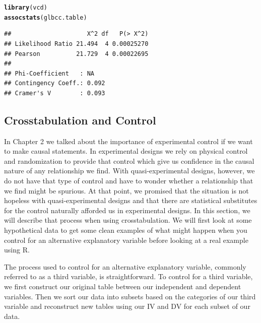 \documentclass[11pt,openany]{book}\usepackage[]{graphicx}\usepackage[]{color}
\makeatletter
\newcommand{\hlstd}[1]{\textcolor[rgb]{0.345,0.345,0.345}{#1}}%
\newcommand{\hlkwd}[1]{\textcolor[rgb]{0.737,0.353,0.396}{\textbf{#1}}}%
\newenvironment{kframe}{%
 \def\at@end@of@kframe{}%
 \ifinner\ifhmode%
  \def\at@end@of@kframe{\end{minipage}}%
  \begin{minipage}{\columnwidth}%
 \fi\fi%
 \def\FrameCommand##1{\hskip\@totalleftmargin \hskip-\fboxsep
 \colorbox{shadecolor}{##1}\hskip-\fboxsep
     \hskip-\linewidth \hskip-\@totalleftmargin \hskip\columnwidth}%
 \MakeFramed {\advance\hsize-\width
   \@totalleftmargin\z@ \linewidth\hsize
   \@setminipage}}%
 {\par\unskip\endMakeFramed%
 \at@end@of@kframe}
\newenvironment{knitrout}{}{} %
\renewenvironment{knitrout}{\begin{singlespace}}{\end{singlespace}} %
\makeatother
\begin{document}
\begin{knitrout}
\color{fgcolor}\begin{kframe}
\begin{alltt}
\hlkwd{library}\hlstd{(vcd)}
\hlkwd{assocstats}\hlstd{(glbcc.table)}
\end{alltt}
\begin{verbatim}
##                     X^2 df   P(> X^2)
## Likelihood Ratio 21.494  4 0.00025270
## Pearson          21.729  4 0.00022695
## 
## Phi-Coefficient   : NA 
## Contingency Coeff.: 0.092 
## Cramer's V        : 0.093
\end{verbatim}
\end{kframe}
\end{knitrout}

\subsection{Crosstabulation and Control}

In Chapter 2 we talked about the importance of experimental control if we want to make causal statements.  In experimental designs we rely on physical control and randomization to provide that control which give us confidence in the causal nature of any relationship we find.  With quasi-experimental designs, however, we do not have that type of control and have to wonder whether a relationship that we find might be spurious.   At that point, we promised that the situation is not hopeless with quasi-experimental designs and that there are statistical substitutes for the control naturally afforded us in experimental designs.  In this section, we will describe that process when using crosstabulation.  We will first look at some hypothetical data to get some clean examples of what might happen when you control for an alternative explanatory variable before looking at a real example using R.

The process used to control for an alternative explanatory variable, commonly referred to as a third variable, is straightforward.   To control for a third variable, we first construct our original table between our independent and dependent variables.  Then we sort our data into subsets based on the categories of our third variable and reconstruct new tables using our IV and DV for each subset of our data. 
\end{document}
